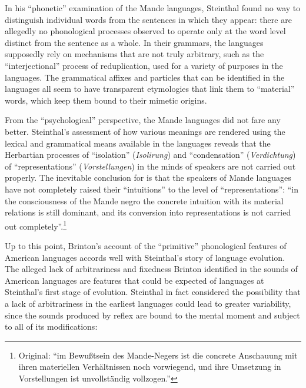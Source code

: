 \documentclass[output=paper]{langscibook}
\begin{document}
In his ``phonetic'' examination of the Mande languages, Steinthal found no way to distinguish individual words from the sentences in which they appear: there are allegedly no phonological processes observed to operate only at the word level distinct from the sentence as a whole. In their grammars, the languages supposedly rely on mechanisms that are not truly arbitrary, such as the ``interjectional'' process of reduplication, used for a variety of purposes in the languages. The grammatical affixes and particles that can be identified in the languages all seem to have transparent etymologies that link them to ``material'' words, which keep them bound to their mimetic origins. 

From the ``psychological'' perspective, the Mande languages did not fare any better. Steinthal's assessment of how various meanings are rendered using the lexical and grammatical means available in the languages reveals that the Herbartian processes of ``isolation'' (\emph{Isolirung}) and ``condensation'' (\emph{Verdichtung}) of ``representations'' (\emph{Vorstellungen}) in the minds of speakers are not carried out properly. The inevitable conclusion for \citet[255]{Steinthal1867} is that the speakers of Mande languages have not completely raised their ``intuitions'' to the level of ``representations'': ``in the consciousness of the Mande negro the concrete intuition with its material relations is still dominant, and its conversion into representations is not carried out completely''.\footnote{Original: ``im Bewußtsein des Mande-Negers ist die concrete Anschauung mit ihren materiellen Verhältnissen noch vorwiegend, und ihre Umsetzung in Vorstellungen ist unvollständig vollzogen.''}

Up to this point, Brinton's account of the ``primitive'' phonological features of American languages accords well with Steinthal's story of language evolution. The alleged lack of arbitrariness and fixedness Brinton identified in the sounds of American languages are features that could be expected of languages at Steinthal's first stage of evolution. Steinthal in fact considered the possibility that a lack of arbitrariness in the earliest languages could lead to greater variability, since the sounds produced by reflex are bound to the mental moment and subject to all of its modifications:
\end{document}

